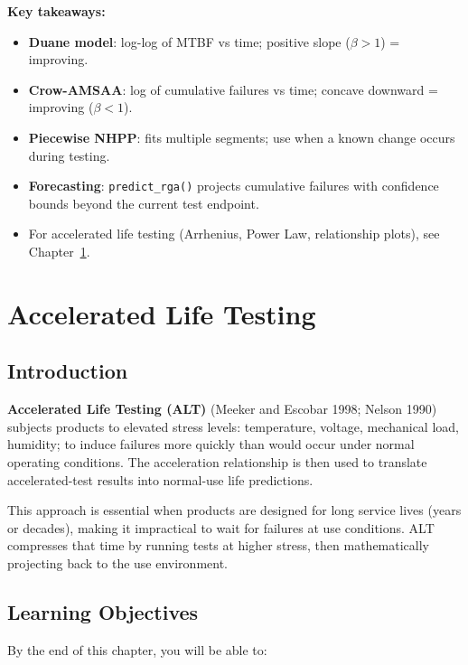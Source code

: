 \documentclass[
  letterpaper,
  DIV=11,
  numbers=noendperiod]{scrreprt}
\providecommand{\tightlist}{%
  \setlength{\itemsep}{0pt}\setlength{\parskip}{0pt}}
\begin{document}
\textbf{Key takeaways:}

\begin{itemize}
\tightlist
\item
  \textbf{Duane model}: log-log of MTBF vs time; positive slope
  (\(\beta > 1\)) = improving.
\item
  \textbf{Crow-AMSAA}: log of cumulative failures vs time; concave
  downward = improving (\(\beta < 1\)).
\item
  \textbf{Piecewise NHPP}: fits multiple segments; use when a known
  change occurs during testing.
\item
  \textbf{Forecasting}: \texttt{predict\_rga()} projects cumulative
  failures with confidence bounds beyond the current test endpoint.
\item
  For accelerated life testing (Arrhenius, Power Law, relationship
  plots), see Chapter~\ref{sec-alt}.
\end{itemize}


\chapter{Accelerated Life Testing}\label{sec-alt}

\section{Introduction}\label{introduction-4}

\textbf{Accelerated Life Testing (ALT)} (Meeker and Escobar 1998; Nelson
1990) subjects products to elevated stress levels: temperature, voltage,
mechanical load, humidity; to induce failures more quickly than would
occur under normal operating conditions. The acceleration relationship
is then used to translate accelerated-test results into normal-use life
predictions.

This approach is essential when products are designed for long service
lives (years or decades), making it impractical to wait for failures at
use conditions. ALT compresses that time by running tests at higher
stress, then mathematically projecting back to the use environment.

\section{Learning Objectives}\label{learning-objectives-4}

By the end of this chapter, you will be able to:
\end{document}

